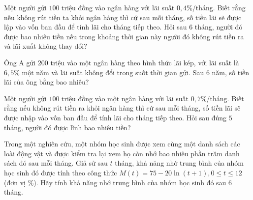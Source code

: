 \begin{ex}%
	Một người gửi $100$ triệu đồng vào ngân hàng với lãi suất $0{,}4\%$/tháng. Biết rằng nếu không rút tiền ta khỏi ngân hàng thì cứ sau mỗi tháng, số tiền lãi sẽ  được lập vào vốn ban đầu để tính lãi cho tháng tiếp theo. Hỏi sau $6$ tháng, người đó được bao nhiêu tiền nếu trong khoảng thời gian này người đó không rút tiền ra và lãi xuất không thay đổi?
\end{ex}

\begin{ex}%
	Ông A gửi $200$  triệu vào một ngân hàng theo hình thức lãi kép, với lãi suất là $6{,}5\%$ một năm và lãi suất không đổi trong suốt thời gian gửi. Sau $6$ năm, số tiền lãi của ông bằng bao nhiêu?
\end{ex}

\begin{ex}%
	Một người gửi $100$ triệu đồng vào một ngân hàng với lãi suất $0{,}7\%$/tháng. Biết rằng nếu không rút tiền ra khỏi ngân hàng thì cứ sau mỗi tháng, số tiền lãi sẽ được nhập vào vốn ban đầu để tính lãi cho tháng tiếp  theo. Hỏi sau đúng $5$ tháng, người đó được lĩnh bao nhiêu tiền?
\end{ex}

\begin{ex}%
	Trong một nghiên cứu, một nhóm học sinh được xem cùng một danh sách các loài động vật và được kiểm tra lại xem họ còn nhớ bao nhiêu phần  trăm danh sách đó sau mỗi tháng. Giả sử sau $t$ tháng, khả năng nhớ trung bình của nhóm học sinh đó được tính theo công thức $M(t)=75-20\ln(t+1), 0\le t\le 12$ (đơn vị $\%$). Hãy tính khả năng nhớ trung bình của nhóm học sinh đó sau $6$ tháng.
\end{ex}

